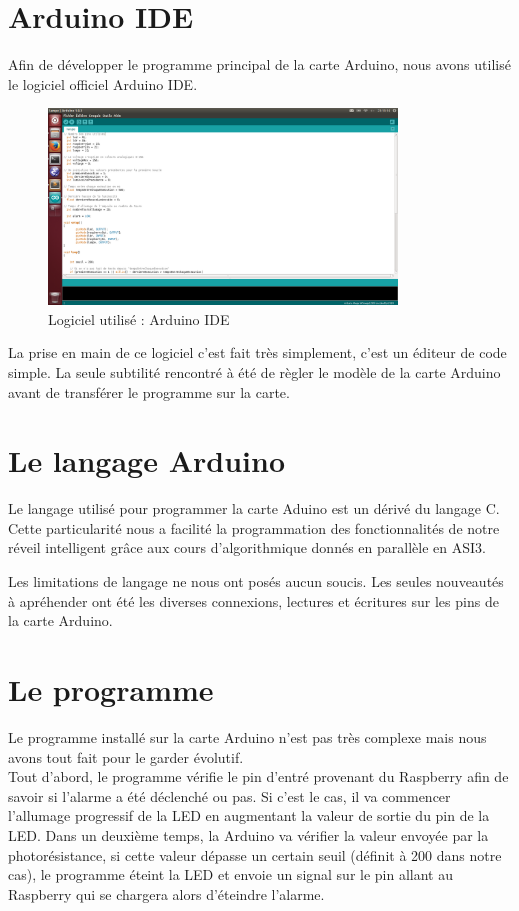 \section{Arduino IDE}
	Afin de développer le programme principal de la carte Arduino, nous avons utilisé le logiciel officiel Arduino IDE.
	\begin{figure}[H]
		\centering
		\includegraphics[width=350px]{images/arduinoIDE.png}
		\caption{Logiciel utilisé : Arduino IDE}
	\end{figure}

	La prise en main de ce logiciel c'est fait très simplement, c'est un éditeur de code simple. La seule subtilité rencontré à été de règler le modèle de la carte Arduino avant de transférer le programme sur la carte.

\section{Le langage Arduino}
	Le langage utilisé pour programmer la carte Aduino est un dérivé du langage C. Cette particularité nous a facilité la programmation des fonctionnalités de notre réveil intelligent grâce aux cours d'algorithmique donnés en parallèle en ASI3.

	Les limitations de langage ne nous ont posés aucun soucis. Les seules nouveautés à apréhender ont été les diverses connexions, lectures et écritures sur les pins de la carte Arduino.

\section{Le programme}
	Le programme installé sur la carte Arduino n'est pas très complexe mais nous avons tout fait pour le garder évolutif.\\

	Tout d'abord, le programme vérifie le pin d'entré provenant du Raspberry afin de savoir si l'alarme a été déclenché ou pas. Si c'est le cas, il va commencer l'allumage progressif de la LED en augmentant la valeur de sortie du pin de la LED. Dans un deuxième temps, la Arduino va vérifier la valeur envoyée par la photorésistance, si cette valeur dépasse un certain seuil (définit à 200 dans notre cas), le programme éteint la LED et envoie un signal sur le pin allant au Raspberry qui se chargera alors d'éteindre l'alarme.\\

